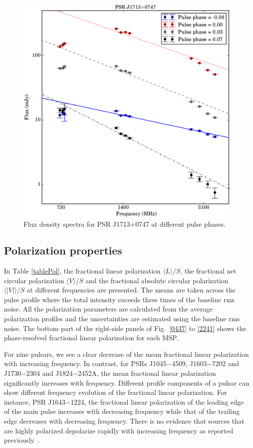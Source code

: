 \documentclass[useAMS,usenatbib]{mn2e}
\begin{document}
\begin{figure}
\begin{center}
\includegraphics[width=3 in]{1713phaseSI.ps}
\caption{Flux density spectra for PSR J1713$+$0747 at different pulse phases.} 
\label{1713SI}
\end{center}
\end{figure}

\subsection{Polarization properties}

In Table \ref{tablePol}, the fractional linear polarization $\langle L \rangle/S$, 
the fractional net circular polarization $\langle V \rangle/S$ and the fractional absolute 
circular polarization $\langle|V|\rangle/S$ at different frequencies are presented. 
%
The means are taken across the pulse profile where the total intensity exceeds 
three times of the baseline rms noise.
%
All the polarization parameters are calculated from the average polarization 
profiles and the uncertainties are estimated using the baseline rms noise. 
%
%
The bottom part of the right-side panels of Fig.~\ref{0437} to \ref{2241} shows the 
phase-resolved fractional linear polarization for each MSP. 
%

For nine pulsars, we see a clear decrease of the mean fractional linear polarization 
with increasing frequency. In contrast, for PSRs J1045$-$4509, J1603$-$7202 and 
J1730$-$2304 and J1824$-$2452A, the mean fractional linear polarization significantly 
increases with frequency. 
%
Different profile components of a pulsar can show different frequency evolution 
of the fractional linear polarization. For instance, PSR J1643$-$1224, the fractional 
linear polarization of the leading edge of the main pulse increases with decreasing 
frequency while that of the trailing edge decreases with decreasing frequency.
%
There is no evidence that sources that are highly polarized depolarize rapidly 
with increasing frequency as reported previously~\citep{Kramer99}.
%
\end{document}
